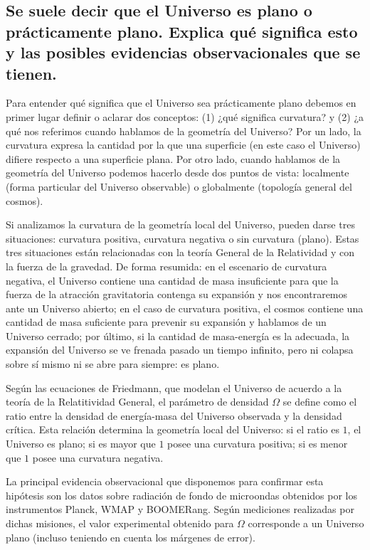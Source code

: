 \documentclass{tufte-handout}
\begin{document}
\clearpage

\subsection{\textbf{Se suele decir que el Universo es plano o prácticamente plano. Explica qué significa esto y las posibles evidencias observacionales que se tienen.}}

Para entender qué significa que el Universo sea prácticamente plano debemos en primer lugar definir o aclarar dos conceptos: (1) ¿qué significa curvatura? y (2) ¿a qué nos referimos cuando hablamos de la geometría del Universo? Por un lado, la curvatura expresa la cantidad por la que una superficie (en este caso el Universo) difiere respecto a una superficie plana. Por otro lado, cuando hablamos de la geometría del Universo podemos hacerlo desde dos puntos de vista: localmente (forma particular del Universo observable) o globalmente (topología general del cosmos).

Si analizamos la curvatura de la geometría local del Universo, pueden darse tres situaciones: curvatura positiva, curvatura negativa o sin curvatura (plano). Estas tres situaciones están relacionadas con la teoría General de la Relatividad y con la fuerza de la gravedad. De forma resumida: en el escenario de curvatura negativa, el Universo contiene una cantidad de masa insuficiente para que la fuerza de la atracción gravitatoria contenga su expansión y nos encontraremos ante un Universo abierto; en el caso de curvatura positiva, el cosmos contiene una cantidad de masa suficiente para prevenir su expansión y hablamos de un Universo cerrado; por último, si la cantidad de masa-energía es la adecuada, la expansión del Universo se ve frenada pasado un tiempo infinito, pero ni colapsa sobre sí mismo ni se abre para siempre: es plano.

Según las ecuaciones de Friedmann, que modelan el Universo de acuerdo a la teoría de la Relatitividad General, el parámetro de densidad $\Omega$ se define como el ratio entre la densidad de energía-masa del Universo observada y la densidad crítica. Esta relación determina la geometría local del Universo: si el ratio es $1$, el Universo es plano; si es mayor que $1$ posee una curvatura positiva; si es menor que $1$ posee una curvatura negativa.

La principal evidencia observacional que disponemos para confirmar esta hipótesis son los datos sobre radiación de fondo de microondas obtenidos por los instrumentos Planck, WMAP y BOOMERang. Según mediciones realizadas por dichas misiones, el valor experimental obtenido para $\Omega$ corresponde a un Universo plano (incluso teniendo en cuenta los márgenes de error).
\end{document}
